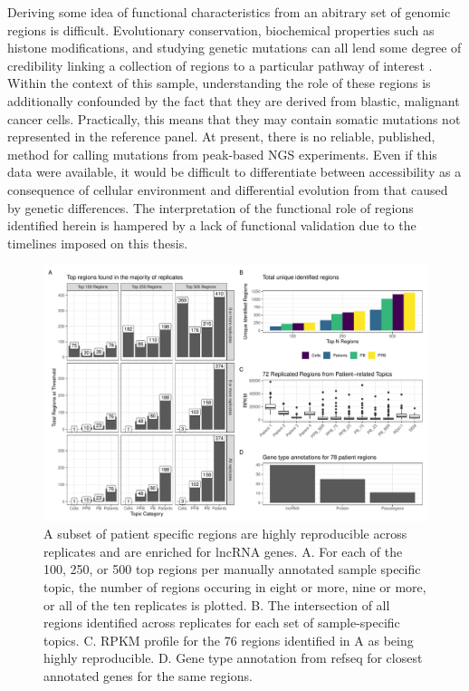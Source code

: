 Deriving some idea of functional characteristics from an abitrary set of genomic regions is difficult. Evolutionary conservation, biochemical properties such as histone modifications, and studying genetic mutations can all lend some degree of credibility linking a collection of regions to a particular pathway of interest \cite{Kellis2014}. Within the context of this sample, understanding the role of these regions is additionally confounded by the fact that they are derived from blastic, malignant cancer cells. Practically, this means that they may contain somatic mutations not represented in the reference panel. At present, there is no reliable, published, method for calling mutations from peak-based NGS experiments. Even if this data were available, it would be difficult to differentiate between accessibility as a consequence of cellular environment and differential evolution from that caused by genetic differences. The interpretation of the functional role of regions identified herein is hampered by a lack of functional validation due to the timelines imposed on this thesis.  

\begin{figure}
    \centering
    \includegraphics[width=\textwidth]{plot/ch5/mll_top_regions_bigwig.pdf}
    \caption[A subset of patient specific regions are highly reproducible across replicates and are enriched for lncRNA genes.]{A subset of patient specific regions are highly reproducible across replicates and are enriched for lncRNA genes. A. For each of the 100, 250, or 500 top regions per manually annotated sample specific topic, the number of regions occuring in eight or more, nine or more, or all of the ten replicates is plotted. B. The intersection of all regions identified across replicates for each set of sample-specific topics. C. RPKM profile for the 76 regions identified in A as being highly reproducible. D. Gene type annotation from refseq for closest annotated genes for the same regions.}
    \label{fig:mll_region_repro}
\end{figure}


